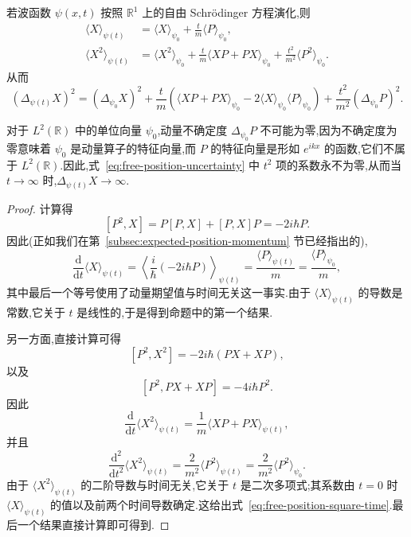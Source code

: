 \begin{proposition}[自由粒子的波包扩散]\label{prop:free-wave-spread}
若波函数 \(\psi(x,t)\) 按照 \(\mathbb{R}^{1}\) 上的自由 Schrödinger 方程演化,则
\begin{align}
\langle X\rangle_{\psi(t)}
&=\langle X\rangle_{\psi_{0}}+\frac{t}{m}\langle P\rangle_{\psi_{0}},\label{eq:free-position-time}\\
\langle X^{2}\rangle_{\psi(t)}
&=\langle X^{2}\rangle_{\psi_{0}}
+\frac{t}{m}\langle XP+PX\rangle_{\psi_{0}}
+\frac{t^{2}}{m^{2}}\langle P^{2}\rangle_{\psi_{0}}.\label{eq:free-position-square-time}
\end{align}
从而
\begin{equation}
(\Delta_{\psi(t)}X)^{2}
=(\Delta_{\psi_{0}}X)^{2}
+\frac{t}{m}\left(\langle XP+PX\rangle_{\psi_{0}}
-2\langle X\rangle_{\psi_{0}}\langle P\rangle_{\psi_{0}}\right)
+\frac{t^{2}}{m^{2}}(\Delta_{\psi_{0}}P)^{2}.
\label{eq:free-position-uncertainty}
\end{equation}
\end{proposition}

对于 \(L^{2}(\mathbb{R})\) 中的单位向量 \(\psi_{0}\),动量不确定度 \(\Delta_{\psi_{0}}P\) 不可能为零,因为不确定度为零意味着 \(\psi_{0}\) 是动量算子的特征向量,而 \(P\) 的特征向量是形如 \(e^{ikx}\) 的函数,它们不属于 \(L^{2}(\mathbb{R})\).因此,式~\eqref{eq:free-position-uncertainty} 中 \(t^{2}\) 项的系数永不为零,从而当 \(t\to\infty\) 时,\(\Delta_{\psi(t)}X\to\infty\).

\begin{proof}
计算得
\[
[P^{2},X]=P[P,X]+[P,X]P=-2i\hbar P.
\]
因此(正如我们在第~\ref{subsec:expected-position-momentum} 节已经指出的),
\[
\frac{\mathrm{d}}{\mathrm{d}t}\langle X\rangle_{\psi(t)}
=\left\langle\frac{i}{\hbar}(-2i\hbar P)\right\rangle_{\psi(t)}
=\frac{\langle P\rangle_{\psi(t)}}{m}
=\frac{\langle P\rangle_{\psi_{0}}}{m},
\]
其中最后一个等号使用了动量期望值与时间无关这一事实.由于 \(\langle X\rangle_{\psi(t)}\) 的导数是常数,它关于 \(t\) 是线性的,于是得到命题中的第一个结果.

另一方面,直接计算可得
\[
[P^{2},X^{2}]
=-2i\hbar(PX+XP),
\]
以及
\[
[P^{2},PX+XP]=-4i\hbar P^{2}.
\]
因此
\[
\frac{\mathrm{d}}{\mathrm{d}t}\langle X^{2}\rangle_{\psi(t)}
=\frac{1}{m}\langle XP+PX\rangle_{\psi(t)},
\]
并且
\[
\frac{\mathrm{d}^{2}}{\mathrm{d}t^{2}}\langle X^{2}\rangle_{\psi(t)}
=\frac{2}{m^{2}}\langle P^{2}\rangle_{\psi(t)}
=\frac{2}{m^{2}}\langle P^{2}\rangle_{\psi_{0}}.
\]
由于 \(\langle X^{2}\rangle_{\psi(t)}\) 的二阶导数与时间无关,它关于 \(t\) 是二次多项式;其系数由 \(t=0\) 时 \(\langle X\rangle_{\psi(t)}\) 的值以及前两个时间导数确定.这给出式~\eqref{eq:free-position-square-time}.最后一个结果直接计算即可得到.
\end{proof}

